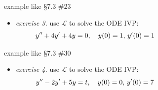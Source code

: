 \documentclass[dvipsnames,colorlinks]{beamer}
\begin{document}
\begin{frame}{example like \S7.3 \#23}

\begin{itemize}
\item \emph{exercise 3.} use $\mathcal{L}$ to solve the ODE IVP:
    $$y''+4y'+4y=0, \quad y(0)=1, \, y'(0)=1 \hspace{40mm}$$

\vspace{60mm}
\end{itemize}
\end{frame}


\begin{frame}{example like \S7.3 \#30}

\begin{itemize}
\item \emph{exercise 4.} use $\mathcal{L}$ to solve the ODE IVP:
    $$y''-2y'+5y=t, \quad y(0)=0, \, y'(0)=7 \hspace{40mm}$$

\vspace{60mm}
\end{itemize}
\end{frame}

\newcommand{\UU}{\mathcal{U}}
\end{document}
